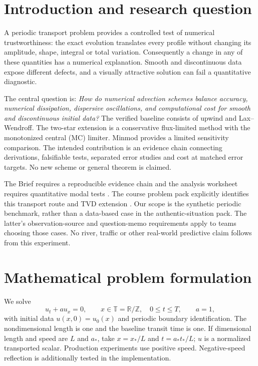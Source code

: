 \section{Introduction and research question}
A periodic transport problem provides a controlled test of numerical trustworthiness: the exact evolution translates every profile without changing its amplitude, shape, integral or total variation. Consequently a change in any of these quantities has a numerical explanation. Smooth and discontinuous data expose different defects, and a visually attractive solution can fail a quantitative diagnostic.

The central question is: \emph{How do numerical advection schemes balance accuracy, numerical dissipation, dispersive oscillations, and computational cost for smooth and discontinuous initial data?} The verified baseline consists of upwind and Lax--Wendroff. The two-star extension is a conservative flux-limited method with the monotonized central (MC) limiter. Minmod provides a limited sensitivity comparison. The intended contribution is an evidence chain connecting derivations, falsifiable tests, separated error studies and cost at matched error targets. No new scheme or general theorem is claimed.

The Brief requires a reproducible evidence chain and the analysis worksheet requires quantitative modal tests \cite{brief,worksheet}. The course problem pack explicitly identifies this transport route and TVD extension \cite{pack}. Our scope is the synthetic periodic benchmark, rather than a data-based case in the authentic-situation pack. The latter's observation-source and question-memo requirements apply to teams choosing those cases. No river, traffic or other real-world predictive claim follows from this experiment.

\section{Mathematical problem formulation}
\label{sec:model}
We solve
\begin{equation}\label{eq:pde}
 u_t+a u_x=0,\qquad x\in\mathbb T=\mathbb R/\mathbb Z,\quad 0\le t\le T,\qquad a=1,
\end{equation}
with initial data $u(x,0)=u_0(x)$ and periodic boundary identification. The nondimensional length is one and the baseline transit time is one. If dimensional length and speed are $L$ and $a_*$, take $x=x_*/L$ and $t=a_*t_*/L$; $u$ is a normalized transported scalar. Production experiments use positive speed. Negative-speed reflection is additionally tested in the implementation.

